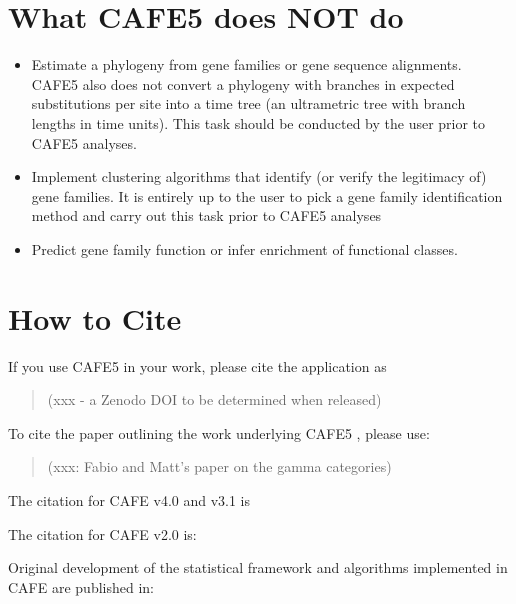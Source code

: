 \documentclass{article}
\newcommand{\shortname}{CAFE5 }
\begin{document}
\section{What CAFE5 does NOT do}
\begin{itemize}
\item{Estimate a phylogeny from gene families or gene sequence alignments. \shortname also does not convert a phylogeny with branches in expected substitutions per site into a time tree (an ultrametric tree with branch lengths in time units). This task should be conducted by the user prior to \shortname analyses.}

\item{Implement clustering algorithms that identify (or verify the legitimacy of) gene families. It is entirely up to the user to pick a gene family identification method and carry out this task prior to \shortname analyses}

\item{Predict gene family function or infer enrichment of functional classes.}
\end{itemize}
\newpage
\section{How to Cite}
If you use \shortname in your work, please cite the application as 

\begin{quotation}
(xxx - a Zenodo DOI to be determined when released)
\end{quotation}
To cite the paper outlining the work underlying \shortname, please use: 

\begin{quotation}
(xxx: Fabio and Matt's paper on the gamma categories)
\end{quotation}

The citation for CAFE v4.0 and v3.1 is
\begin{quotation}
\end{quotation}

The citation for CAFE v2.0 is:
\begin{quotation}
\end{quotation}

Original development of the statistical framework and algorithms implemented in CAFE are published in:
\begin{quotation}
\end{quotation}
\end{document}
